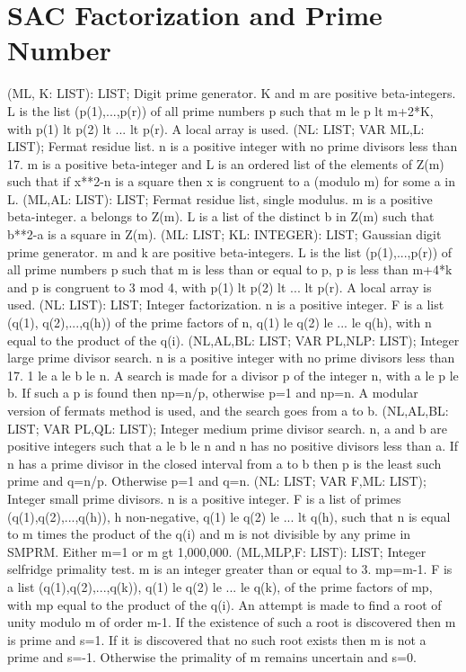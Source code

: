 \section{ SAC Factorization and Prime Number  } 
 (ML, K: LIST): LIST; \eproc
\bcom Digit prime generator. K and m are positive beta-integers.
L is the list (p(1),...,p(r)) of all prime numbers p such that 
m le p lt m+2*K, with p(1) lt p(2) lt ... lt p(r).  
A local array is used. \ecom 
{} (NL: LIST; VAR ML,L: LIST); \eproc
\bcom Fermat residue list. n is a positive integer with no prime divisors
less than 17.  m is a positive beta-integer and L is an ordered list
of the elements of Z(m) such that if x**2-n is a square then x is
congruent to a (modulo m) for some a in L. \ecom 
{} (ML,AL: LIST): LIST; \eproc
\bcom Fermat residue list, single modulus. m is a positive beta-integer.
a belongs to Z(m).  L is a list of the distinct b in Z(m) such
that b**2-a is a square in Z(m). \ecom 
{} (ML: LIST; KL: INTEGER): LIST; \eproc
\bcom Gaussian digit prime generator. m and k are positive beta-integers.
L is the list (p(1),...,p(r)) of all prime numbers p such that m is 
less than or equal to p, p is less than m+4*k and p is congruent to 
3 mod 4, with p(1) lt p(2) lt ... lt p(r). A local array is used. \ecom 
{} (NL: LIST): LIST; \eproc
\bcom Integer factorization. n is a positive integer. F is a list
(q(1), q(2),...,q(h)) of the prime factors of n, q(1) le q(2) le ...
le q(h), with n equal to the product of the q(i). \ecom 
{} (NL,AL,BL: LIST; VAR PL,NLP: LIST); \eproc
\bcom Integer large prime divisor search. n is a positive integer with
no prime divisors less than 17.  1 le a le b le n.  A search is made
for a divisor p of the integer n, with a le p le b.  If such a p
is found then np=n/p, otherwise p=1 and np=n.  A modular version
of fermats method is used, and the search goes from a to b. \ecom 
{} (NL,AL,BL: LIST; VAR PL,QL: LIST); \eproc
\bcom Integer medium prime divisor search. n, a and b are positive
integers such that a le b le n and n has no
positive divisors less than a.  If n has a prime
divisor in the closed interval from a to b then p is the least
such prime and q=n/p. Otherwise p=1 and q=n. \ecom 
{} (NL: LIST; VAR F,ML: LIST); \eproc
\bcom Integer small prime divisors. n is a positive integer.
F is a list of primes (q(1),q(2),...,q(h)), h non-negative,
q(1) le q(2) le ... lt q(h), such that n is equal to m times the
product of the q(i) and m is not divisible by any prime in SMPRM.
Either m=1 or m gt 1,000,000. \ecom 
{} (ML,MLP,F: LIST): LIST; \eproc
\bcom Integer selfridge primality test. m is an integer greater than or
equal to 3.  mp=m-1.  F is a list (q(1),q(2),...,q(k)),
q(1) le q(2) le ... le q(k), of the prime factors of mp, with
mp equal to the product of the q(i). An attempt is made to find a 
root of unity modulo m of order m-1.  If the existence of such a root 
is discovered then m is prime and s=1.  If it is discovered that no such
root exists then m is not a prime and s=-1.  Otherwise the primality
of m remains uncertain and s=0. \ecom 

